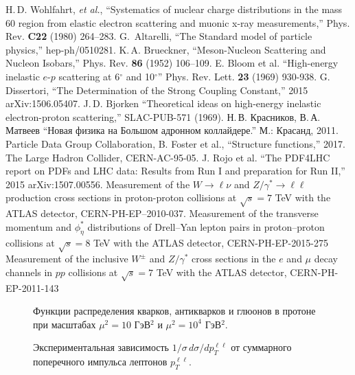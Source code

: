 \documentclass[12pt, a4paper]{article}
\begin{document}
\clearpage
\begin{thebibliography}{10}
	H.\,D. Wohlfahrt, \textit{et al.}, ``Systematics of nuclear charge distributions in the mass 60 region from elastic electron scattering and muonic x-ray measurements,''{} Phys. Rev. \textbf{C22} (1980) 264--283.
	G.~Altarelli, ``The Standard model of particle physics,''  hep-ph/0510281.
	K.\,A. Brueckner, “Meson-Nucleon Scattering and Nucleon Isobars,” Phys. Rev. \textbf{86} (1952) 106–109.
	E. Bloom et al. ``High-energy inelastic $e$-$p$ scattering at 6$^\circ$ and 10$^\circ$'' Phys. Rev. Lett. \textbf{23} (1969) 930-938.
	G. Dissertori, ``The Determination of the Strong Coupling Constant,'' 2015 arXiv:1506.05407.
	J.\,D. Bjorken ``Theoretical ideas on high-energy inelastic electron-proton scattering,'' SLAC-PUB-571 (1969). 
	Н.\,В. Красников, В.\,А. Матвеев ``Новая физика на Большом адронном коллайдере.'' М.: Красанд, 2011.
	Particle Data Group Collaboration, B. Foster et al., ``Structure functions,'' 2017.
	The Large Hadron Collider, CERN-AC-95-05.
	J. Rojo et al. ``The PDF4LHC report on PDFs and LHC data: Results from Run I and preparation for Run II,'' 2015 arXiv:1507.00556.
	Measurement of the $W\rightarrow\ell\nu$ and $Z/\gamma^*\rightarrow\ell\ell$ production cross sections in proton-proton collisions at $\sqrt{s}=7$ TeV with the ATLAS detector, CERN-PH-EP–2010-037.
	Measurement of the transverse momentum and $\phi^*_\eta$ distributions of Drell–Yan lepton pairs in proton–proton collisions at $\sqrt{s} = 8$ TeV with the ATLAS detector, CERN-PH-EP-2015-275
	Measurement of the inclusive $W^\pm$ and $Z/\gamma^*$ cross sections in the $e$ and $\mu$ decay channels in $pp$ collisions at $\sqrt{s} = 7$ TeV with the ATLAS detector, CERN-PH-EP-2011-143


\end{thebibliography}

\begin{figure}[!p]
	\caption{Функции распределения кварков, антикварков и глюонов в протоне при масштабах $\mu^2=10$ ГэВ$^2$ и $\mu^2=10^4$ ГэВ$^2$.}
	\label{fig:pdgPDF}
\end{figure}

\begin{figure}[!p]
	\caption{Экспериментальная зависимость $1/\sigma\, d\sigma/dp_T^{\ell\ell}$ от суммарного поперечного импульса лептонов $p_T^{\ell\ell}$.}
	\label{fig:ZpTHistogram}
\end{figure}
\end{document}
